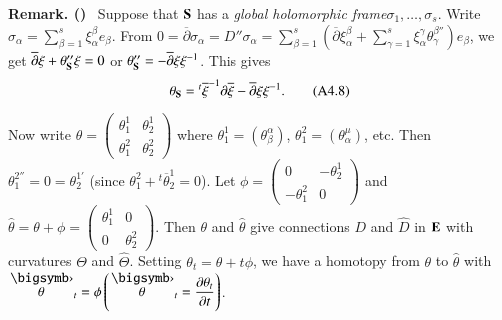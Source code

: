 \medskip
\noindent
{\bf Remark. ()\label{art08-A4.7}}~ Suppose that $\mathbf{S}$ has a {\em global holomorphic frame}\break $\sigma_{1},\ldots,\sigma_{s}$. Write $\sigma_{\alpha}=\sum\limits^{s}_{\beta=1}\xi^{\beta}_{\alpha}e_{\beta}$. From $0=\overline{\partial}\sigma_{\alpha}=D''\sigma_{\alpha}=\sum\limits^{s}_{\beta=1}(\overline{\partial}\xi^{\beta}_{\alpha}+\sum\limits^{s}_{\gamma=1}\xi^{\gamma}_{\alpha}\theta^{\beta''}_{\gamma})e_{\beta}$, we get $\overline{\partial}\xi+\theta''_{\mathbf{S}}\xi=0$ or $\theta''_{\mathbf{S}}=-\overline{\partial}\xi\xi^{-1}$. This gives
\begin{equation*}
\theta_{\mathbf{S}}={}^{t}\overline{\xi}^{-1}\partial \overline{\xi}-\overline{\partial}\xi\xi^{-1}.\tag{A4.8}\label{art08-sec4-eqA4.8}
\end{equation*}

Now write $\theta=\left(\begin{smallmatrix} \theta^{1}_{1} & \theta^{1}_{2}\\ \theta^{2}_{1} & \theta^{2}_{2}\end{smallmatrix}\right)$ where $\theta^{1}_{1}=(\theta^{\alpha}_{\beta})$, $\theta^{2}_{1}=(\theta^{\mu}_{\alpha})$, etc. Then $\theta^{2''}_{1}=0=\theta^{1'}_{2}$ (since $\theta^{2}_{1}+{}^{t}\overline{\theta}^{1}_{2}=0$). Let $\phi=\left(\begin{smallmatrix} 0 & - \theta^{1}_{2}\\ -\theta^{2}_{1} & 0\end{smallmatrix}\right)$ and $\widehat{\theta}=\theta+\phi=\left(\begin{smallmatrix} \theta^{1}_{1} & 0\\ 0 & \theta^{2}_{2}\end{smallmatrix}\right)$. Then $\theta$ and $\widehat{\theta}$ give connections $D$ and $\widehat{D}$ in $\mathbf{E}$ with curvatures $\Theta$ and $\widehat{\Theta}$. Setting $\theta_{t}=\theta+t\phi$, we have a homotopy from $\theta$ to $\widehat{\theta}$ with $\overdot{\theta}_{t}=\phi\left(\overdot{\theta}_{t}=\dfrac{\partial \theta_{t}}{\partial t}\right)$.

